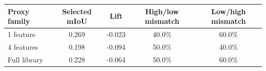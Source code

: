 \begin{tabular}{p{}cccc}
\toprule
Proxy family & Selected mIoU & Lift & High/low mismatch & Low/high mismatch \\
\midrule
1 feature & 0.269 & -0.023 & 40.0\% & 60.0\% \\
4 features & 0.198 & -0.094 & 50.0\% & 40.0\% \\
Full library & 0.228 & -0.064 & 50.0\% & 60.0\% \\
\bottomrule
\end{tabular}
